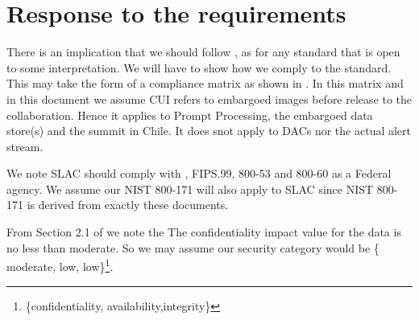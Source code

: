\section{Response to the requirements}\label{sec:resp}

There is an implication that we should follow , as for any standard that is open to some interpretation.
We will have to show how we comply to the standard.
This may take the form of a compliance matrix as shown in .
In this matrix and in this document we assume CUI refers to embargoed images before release to the collaboration.
Hence it applies to Prompt Processing, the embargoed data store(s) and the summit in Chile. It does snot apply to DACs nor the actual alert stream.

We note SLAC should comply with , FIPS.99, 800-53 and 800-60 as a Federal agency.
We assume our NIST 800-171  will also apply to SLAC since NIST 800-171 is derived from exactly these documents.

From Section 2.1 of  we note the The confidentiality impact value for the data  is no less than moderate.
So we may assume our  security category would be \{ moderate, low, low\}\footnote{\{confidentiality, availability,integrity\}}.









